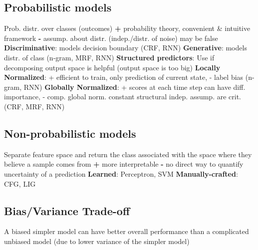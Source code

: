 \documentclass[a4paper, 11pt, landscape]{article}
\begin{document}
\begin{multicols*}{3}
\subsection{Probabilistic models}
Prob. distr. over classes (outcomes)\newline
\phantom{..}\textbf{+} probability theory, convenient \& intuitive framework\newline 
\phantom{..}\textbf{-} assump. about distr. (indep./distr. of noise) may be false\newline
\textbf{Discriminative}: models decision boundary (CRF, RNN)\newline
\textbf{Generative}: models distr. of class (n-gram, MRF, RNN)\newline
\phantom{....}\textbf{Structured predictors}: Use if decomposing output space\newline
\phantom{....}is helpful (output space is too big)\newline
\phantom{........}\textbf{Locally Normalized}: + efficient to train, only prediction\newline
\phantom{........}of current state, - label bias (n-gram, RNN)\newline
\phantom{........}\textbf{Globally Normalized}: + scores at each time step can\newline
\phantom{........}have diff. importance, - comp. global norm. constant\newline
\phantom{........}structural indep. assump. are crit. (CRF, MRF, RNN)

\subsection{Non-probabilistic models}
Separate feature space and return the class associated with the space where they believe a sample comes from\newline
\phantom{..}\textbf{+} more interpretable\newline 
\phantom{..}\textbf{-} no direct way to quantify uncertainty of a prediction\newline
\textbf{Learned}: Perceptron, SVM\newline
\textbf{Manually-crafted}: CFG, LIG

\subsection{Bias/Variance Trade-off}
A biased simpler model can have better overall performance than a complicated
unbiased model (due to lower variance of the simpler model)


\end{multicols*}
\end{document}
